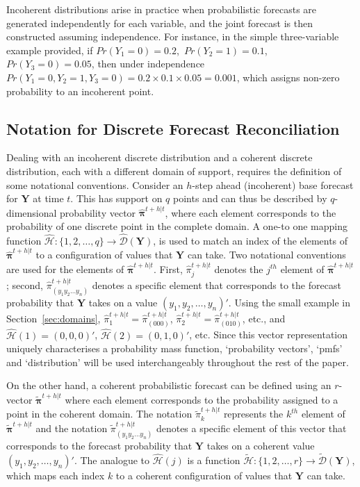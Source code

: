 \documentclass[a4paper,review,12pt,authoryear]{elsarticle}
\newcommand{\bY}{\mathbf{Y}}
\newcommand{\bpi}{\bm{\pi}}
\theoremstyle{definition}
\begin{document}
  Incoherent distributions arise in practice when probabilistic forecasts are generated independently for each variable, and the joint forecast is then constructed assuming independence. For instance, in the simple three-variable example provided, if  $Pr(Y_1=0)=0.2$,~$Pr(Y_2=1)=0.1$,~$Pr(Y_3=0)=0.05$, then under independence $Pr(Y_1=0,Y_2=1,Y_3=0)=0.2\times0.1\times0.05=0.001$, which assigns non-zero probability to an incoherent point.


  \subsection{Notation for Discrete Forecast Reconciliation}

  \label{sec:coherent_df}

  Dealing with an incoherent discrete distribution and a coherent discrete distribution, each with a different domain of support, requires the definition of some notational conventions. Consider an $h$-step ahead (incoherent) base forecast for $\bY$ at time $t$. This has support on $q$ points and can thus be described by $q$-dimensional probability vector $\hat{\bpi}^{t+h|t}$, where each element corresponds to the probability of one discrete point in the complete domain. A one-to one mapping function $\hat{\mathcal{H}}:\{1,2,\dots,q\}\rightarrow\hat{\mathcal{D}}(\bY)$, is used to match an index of the elements of $\hat{\bpi}^{t+h|t}$ to a configuration of values that $\bY$ can take. Two notational conventions are used for the elements of $\hat{\bpi}^{t+h|t}$.
  First, $\hat{\pi}_j^{t+h|t}$ denotes the $j^{th}$ element of $\hat{\bpi}^{t+h|t}$;
  second, $\hat{\pi}_{(y_1 y_2 \dots y_n)}^{t+h|t}$ denotes a specific element that corresponds to the forecast probability that $\bY$ takes on a value $(y_1,y_2,\dots,y_n)'$. 
  Using the small example in Section~\ref{sec:domains}, $\hat{\pi}_1^{t+h|t}=\hat{\pi}_{(000)}^{t+h|t}$, $\hat{\pi}_2^{t+h|t}=\hat{\pi}_{(010)}^{t+h|t}$, etc., and $\hat{\mathcal{H}}(1)=(0,0,0)'$, $\hat{\mathcal{H}}(2)=(0,1,0)'$, etc. Since this vector representation uniquely characterises a probability mass function, `probability vectors', `pmfs' and `distribution' will be used interchangeably throughout the rest of the paper.


  On the other hand, a coherent probabilistic forecast can be defined using an $r$-vector $\tilde{\bpi}^{t+h|t}$ where each element corresponds to the probability assigned to a point in the coherent domain.
  The notation $\tilde{\pi}_k^{t+h|t}$ represents the $k^{th}$ element of $\tilde{\bpi}^{t+h|t}$ and the notation $\tilde{\pi}_{(y_1 y_2 \dots y_n)}^{t+h|t}$ denotes a specific element of this vector that corresponds to the forecast probability that $\bY$ takes on a coherent value $(y_1,y_2,\dots,y_n)'$.
  The analogue to $\hat{\mathcal{H}}(j)$ is a function  $\tilde{\mathcal{H}}:\{1,2,\dots,r\}\rightarrow\tilde{\mathcal{D}}(\bY)$, which maps each index $k$ to a coherent configuration of values that $\bY$ can take.
\end{document}
